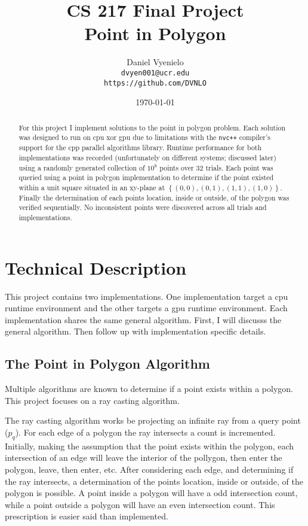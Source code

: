 \documentclass{article}
\begin{document}
\title{CS 217 Final Project \\ Point in Polygon}
\author{Daniel Vyenielo\\
		\texttt{dvyen001@ucr.edu}\\
		\texttt{https://github.com/DVNLO}}
\date{\today}
\maketitle

\begin{abstract}
For this project I implement solutions to the point in polygon problem. Each solution was designed to run on cpu xor gpu due to limitations with the \texttt{nvc++} compiler's support for the cpp parallel algorithms library. Runtime performance for both implementations was recorded (unfortunately on different systems; discussed later) using a randomly generated collection of $10^8$ points over 32 trials. Each point was queried using a point in polygon implementation to determine if the point existed within a unit square situated in an xy-plane at $\left\lbrace (0,0), (0,1), (1,1), (1,0) \right\rbrace$. Finally the determination of each points location, inside or outside, of the polygon was verified sequentially. No inconsistent points were discovered across all trials and implementations.
\end{abstract}

\section{Technical Description}
This project contains two implementations. One implementation target a cpu runtime environment and the other targets a gpu runtime environment. Each implementation shares the same general algorithm. First, I will discusss the general algorithm. Then follow up with implementation specific details.

\subsection{The Point in Polygon Algorithm}
Multiple algorithms are known to determine if a point exists within a polygon. This project focuses on a ray casting algorithm. 

The ray casting algorithm works be projecting an infinite ray from a query point ($p_q$). For each edge of a polygon the ray intersects a count is incremented. Initially, making the assumption that the point exists within the polygon, each intersection of an edge will leave the interior of the pollygon, then enter the polygon, leave, then enter, etc. After considering each edge, and determining if the ray intersects, a determination of the points location, inside or outside, of the polygon is possible. A point inside a polygon will have a odd intersection count, while a point outside a polygon will have an even intersection count. This prescription is easier said than implemented. 
\end{document}
